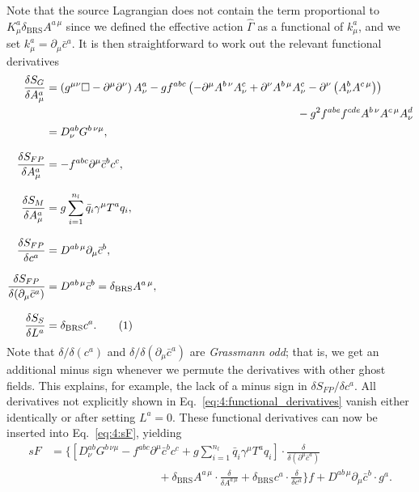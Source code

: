 Note that the source Lagrangian does not contain the term proportional to $K^a_\mu \delta_\text{BRS} A^{a\, \mu}$ since we defined the effective action $\hat{\Gamma}$ as a functional of $k^a_\mu$, and we set $k^a_\mu = \partial_\mu \bar{c}^a$. It is then straightforward to work out the relevant functional derivatives
\begin{align*}
\frac{\delta S_G}{\delta A^a_\mu} &= \left(g^{\mu \nu} \Box - \partial^\mu \partial^\nu \right)A^a_\nu - g f^{abc} \left(- \partial^\mu A^{b \, \nu} A^c_\nu + \partial^\nu A^{b\, \mu} A^c_\nu - \partial^\nu \left(A^b_\nu A^{c\, \mu} \right) \right) \\
&\hspace{8cm} - g^2 f^{abe} f^{cd e} A^{b \, \nu} A^{c\, \mu} A^{d}_\nu \\
&= D^{ab}_{\nu} G^{b\, \nu \mu},  \\[8pt]
\frac{\delta S_{FP}}{\delta A^a_\mu} &= - f^{abc} \partial^\mu \bar{c}^b c^c, \\[8pt]
\frac{\delta S_{M}}{\delta A^a_\mu} &= g \sum_{i = 1}^{n_l} \bar{q}_i \gamma^\mu T^a q_i,\\[8pt]
\frac{\delta S_{FP}}{\delta c^a} &= D^{ab\, \mu } \partial_\mu \bar{c}^b, \\[8pt]
\frac{\delta S_{FP}}{\delta (\partial_\mu \bar{c}^a)} &= D^{ab\, \mu} \bar{c}^b = \delta_{\text{BRS}} A^{a\, \mu}, \\[8pt]
\frac{\delta S_S}{\delta L^a} &= \delta_{\text{BRS}} c^a.
\refstepcounter{equation}
\tag{\theequation} \label{eq:4:functional_derivatives}
\end{align*}
Note that $\delta/\delta (c^a)$ and $\delta/\delta(\partial_\mu \bar{c}^a)$ are \textit{Grassmann odd}; that is, we get an additional minus sign whenever we permute the derivatives with other ghost fields. This explains, for example, the lack of a minus sign in $\delta S_{FP}/\delta c^a$. All derivatives not explicitly shown in Eq.~\eqref{eq:4:functional_derivatives} vanish either identically or after setting $L^a = 0$. These functional derivatives can now be inserted into Eq.~\eqref{eq:4:sF}, yielding
\begin{equation}
\begin{split}
sF &= \Bigg \lbrace \left[ D^{ab}_\nu G^{b\, \nu \mu} - f^{abc} \partial^\mu \bar{c}^b c^c + g \sum_{i = 1}^{n_l} \bar{q}_i \gamma^\mu T^a q_i \right] \cdot \frac{\delta}{\delta (\partial^\mu \bar{c}^a)} \\
& \hspace{4cm} + \delta_{\text{BRS}} A^{a \, \mu} \cdot \frac{\delta}{\delta A^{a\, \mu}} + \delta_{\text{BRS}} c^a \cdot \frac{\delta}{ \delta c^a} \Bigg \rbrace f  + D^{ab\, \mu} \partial_\mu \bar{c}^b \cdot g^a.
\end{split}
\end{equation}
